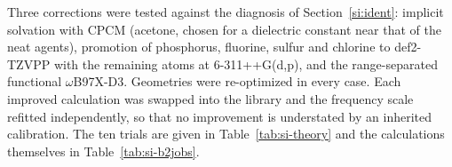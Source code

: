 \documentclass[11pt]{article}
\begin{document}
Three corrections were tested against the diagnosis of Section~\ref{si:ident}: implicit
solvation with CPCM (acetone, chosen for a dielectric constant near that of the neat
agents), promotion of phosphorus, fluorine, sulfur and chlorine to def2-TZVPP with the
remaining atoms at 6-311++G(d,p), and the range-separated functional $\omega$B97X-D3.
Geometries were re-optimized in every case. Each improved calculation was swapped into
the library and the frequency scale refitted independently, so that no improvement is
understated by an inherited calibration. The ten trials are given in
Table~\ref{tab:si-theory} and the calculations themselves in
Table~\ref{tab:si-b2jobs}.

\end{document}
